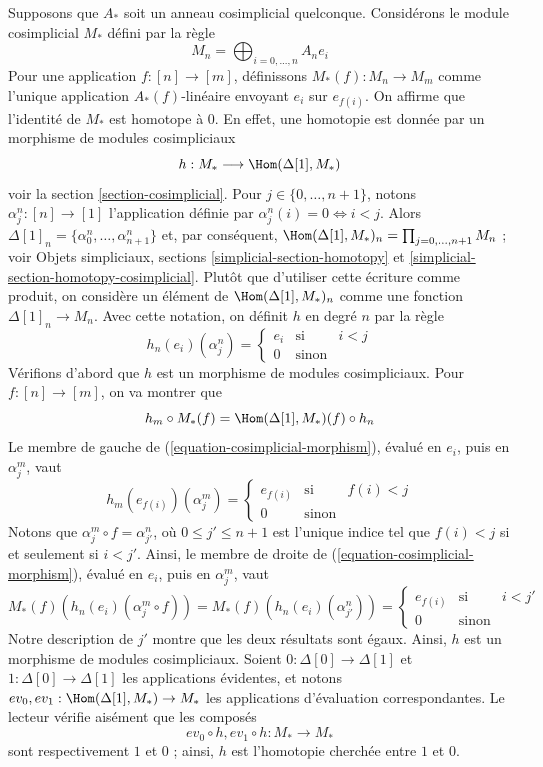 \begin{example}
\label{example-cosimplicial-module}
Supposons que $A_*$ soit un anneau cosimplicial quelconque.
Considérons le module cosimplicial $M_*$ défini par la règle
$$
M_n = \bigoplus\nolimits_{i = 0, ..., n} A_n e_i
$$
Pour une application $f : [n] \to [m]$, définissons $M_*(f) : M_n \to M_m$
comme l'unique application $A_*(f)$-linéaire envoyant $e_i$ sur $e_{f(i)}$.
On affirme que l'identité de $M_*$ est homotope à $0$.
En effet, une homotopie est donnée par un morphisme de modules cosimpliciaux
$$
h : M_* \longrightarrow \Hom(\Delta[1], M_*)
$$
voir la section \ref{section-cosimplicial}.
Pour $j \in \{0, \ldots, n + 1\}$, notons $\alpha^n_j : [n] \to [1]$ l'application
définie par $\alpha^n_j(i) = 0 \Leftrightarrow i < j$. Alors
$\Delta[1]_n = \{\alpha^n_0, \ldots, \alpha^n_{n + 1}\}$ et, par conséquent,
$\Hom(\Delta[1], M_*)_n = \prod_{j = 0, \ldots, n + 1} M_n$ ; voir
Objets simpliciaux, sections \ref{simplicial-section-homotopy} et
\ref{simplicial-section-homotopy-cosimplicial}. Plutôt que d'utiliser
cette écriture comme produit, on considère un élément
de $\Hom(\Delta[1], M_*)_n$ comme une fonction $\Delta[1]_n \to M_n$.
Avec cette notation, on définit $h$ en degré $n$ par la règle
$$
h_n(e_i)(\alpha^n_j) =
\left\{
\begin{matrix}
e_{i} & \text{si} & i < j \\
0 & \text{sinon} 
\end{matrix}
\right.
$$
Vérifions d'abord que $h$ est un morphisme de modules cosimpliciaux. Pour
$f : [n] \to [m]$, on va montrer que
\begin{equation}
\label{equation-cosimplicial-morphism}
h_m \circ M_*(f) = \Hom(\Delta[1], M_*)(f) \circ h_n
\end{equation}
Le membre de gauche de (\ref{equation-cosimplicial-morphism}), évalué en
$e_i$, puis en $\alpha^m_j$, vaut
$$
h_m(e_{f(i)})(\alpha^m_j) =
\left\{
\begin{matrix}
e_{f(i)} & \text{si} & f(i) < j \\
0 & \text{sinon}
\end{matrix}
\right.
$$
Notons que $\alpha^m_j \circ f = \alpha^n_{j'}$, où
$0 \leq j' \leq n + 1$ est l'unique indice tel que $f(i) < j$
si et seulement si $i < j'$. Ainsi, le membre de droite de
(\ref{equation-cosimplicial-morphism}), évalué en $e_i$,
puis en $\alpha^m_j$, vaut
$$
M_*(f)(h_n(e_i)(\alpha^m_j \circ f)) =
M_*(f)(h_n(e_i)(\alpha^n_{j'})) =
\left\{
\begin{matrix}
e_{f(i)} & \text{si} & i < j' \\
0 & \text{sinon} 
\end{matrix}
\right.
$$
Notre description de $j'$ montre que les deux résultats sont égaux.
Ainsi, $h$ est un morphisme de modules cosimpliciaux.
Soient $0 : \Delta[0] \to \Delta[1]$ et
$1 : \Delta[0] \to \Delta[1]$ les applications évidentes, et notons
$ev_0, ev_1 : \Hom(\Delta[1], M_*) \to M_*$ les applications
d'évaluation correspondantes. Le lecteur vérifie aisément que
les composés
$$
ev_0 \circ h, ev_1 \circ h : M_* \longrightarrow M_*
$$
sont respectivement $1$ et $0$ ; ainsi, $h$ est l'homotopie cherchée entre
$1$ et $0$.
\end{example}

